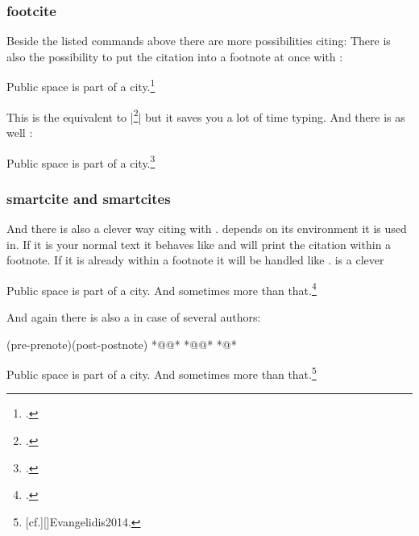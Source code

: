 \documentclass[a4paper,
10pt,
greek,
french,
spanish,
italian,
ngerman,
english
]{ltxdoc}
\begin{document}
\subsubsection{footcite}
 \DescribeMacro{\footcite}
 Beside the listed  commands above there are more possibilities citing:
 There is also the possibility to put the citation into a footnote at once with :
\begin{example}
Public space is part of a city.\footcite{Osland2016}
\end{example}
This is the equivalent to |\footnote{\cite{Osland2016}.}| but it saves you a lot of time typing.
 \DescribeMacro{\footcites} And there is as well :
\begin{example}
Public space is part of a city.\footcites(cf.)(){Osland2016}{Evangelidis2014}
\end{example}
 
 \subsubsection{smartcite and smartcites}

\DescribeMacro{\smartcite}
And there is also a clever way citing with .
 depends on its environment it is used in. If it is your normal text it behaves like  and will print the citation within a footnote.
If it is already within a footnote it will be handled like . 
 is a clever 

\begin{example}
Public space is part of a city.\smartcite{Osland2016} 
And sometimes more than that.\footnote{\smartcite[cf.][]{Evangelidis2014}.}
\end{example}


\DescribeMacro{\smartcites}
And again there is also a  in case of several authors: 
\begin{code}
\smartcites(pre-prenote)(post-postnote)%
  *@@*%
  *@@*%
  *@\ldots@*
\end{code}
\begin{example}
Public space is part of a city. 
And sometimes more than that.\footnote{[cf.][]{Evangelidis2014}.}
\end{example}
\end{document}
